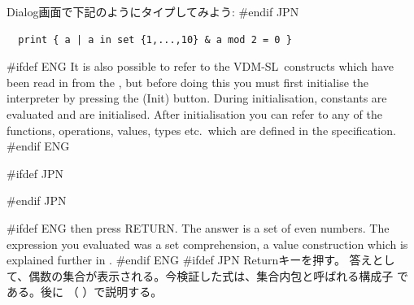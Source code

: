 \documentclass[\pformat,12pt]{article}
\newcommand{\vdmslpp}{VDM-SL}
\newcommand{\vdmslpp}{VDM++}
\newcommand{\guicmd}[1]{{\sf #1}}
\newcommand{\guicmd}[1]{{\gt #1}}
\begin{document}
Dialog画面で下記のようにタイプしてみよう:
#endif JPN

\begin{verbatim}
  print { a | a in set {1,...,10} & a mod 2 = 0 }
\end{verbatim}

#ifdef ENG
It is also possible to refer to the \vdmslpp\ constructs which have
been read in from the 
, but before doing this you must first
initialise the 
interpreter by pressing the 
(\guicmd{Init}) button. 
During initialisation, constants are 
evaluated and  are initialised. 
After initialisation you can refer to any of the functions,
operations, 
values, types etc.\ which are defined in the
 specification.
#endif ENG

#ifdef JPN

#endif JPN

#ifdef ENG
then press RETURN.  The answer is a set of even
numbers. The expression you evaluated was a set comprehension, a value
construction which is explained further in
.
#endif ENG
#ifdef JPN
Returnキーを押す。
答えとして、偶数の集合が表示される。今検証した式は、集合内包と呼ばれる構成子
である。後に
（
{
\cite{UMLMan-CSK}
}
{
\cite{LangManPP-CSK}
}
）で説明する。
\end{document}
